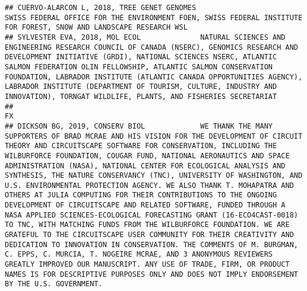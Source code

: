 \documentclass[]{article}
\begin{document}
\begin{verbatim}
## CUERVO-ALARCON L, 2018, TREE GENET GENOMES                                                                                                                                                                                                                                                                                                                   SWISS FEDERAL OFFICE FOR THE ENVIRONMENT FOEN, SWISS FEDERAL INSTITUTE FOR FOREST, SNOW AND LANDSCAPE RESEARCH WSL
## SYLVESTER EVA, 2018, MOL ECOL              NATURAL SCIENCES AND ENGINEERING RESEARCH COUNCIL OF CANADA (NSERC), GENOMICS RESEARCH AND DEVELOPMENT INITIATIVE (GRDI), NATIONAL SCIENCES NSERC, ATLANTIC SALMON FEDERATION OLIN FELLOWSHIP, ATLANTIC SALMON CONSERVATION FOUNDATION, LABRADOR INSTITUTE (ATLANTIC CANADA OPPORTUNITIES AGENCY), LABRADOR INSTITUTE (DEPARTMENT OF TOURISM, CULTURE, INDUSTRY AND INNOVATION), TORNGAT WILDLIFE, PLANTS, AND FISHERIES SECRETARIAT
##                                                                                                                                                                                                                                                                                                                                                                                                                                                                                                                                                                                                                                                                                                                                                                                                                                                                                                                                                                                                                                                                                                                                                 FX
## DICKSON BG, 2019, CONSERV BIOL             WE THANK THE MANY SUPPORTERS OF BRAD MCRAE AND HIS VISION FOR THE DEVELOPMENT OF CIRCUIT THEORY AND CIRCUITSCAPE SOFTWARE FOR CONSERVATION, INCLUDING THE WILBURFORCE FOUNDATION, COUGAR FUND, NATIONAL AERONAUTICS AND SPACE ADMINISTRATION (NASA), NATIONAL CENTER FOR ECOLOGICAL ANALYSIS AND SYNTHESIS, THE NATURE CONSERVANCY (TNC), UNIVERSITY OF WASHINGTON, AND U.S. ENVIRONMENTAL PROTECTION AGENCY. WE ALSO THANK T. MOHAPATRA AND OTHERS AT JULIA COMPUTING FOR THEIR CONTRIBUTIONS TO THE ONGOING DEVELOPMENT OF CIRCUITSCAPE AND RELATED SOFTWARE, FUNDED THROUGH A NASA APPLIED SCIENCES-ECOLOGICAL FORECASTING GRANT (16-ECO4CAST-0018) TO TNC, WITH MATCHING FUNDS FROM THE WILBURFORCE FOUNDATION. WE ARE GRATEFUL TO THE CIRCUITSCAPE USER COMMUNITY FOR THEIR CREATIVITY AND DEDICATION TO INNOVATION IN CONSERVATION. THE COMMENTS OF M. BURGMAN, C. EPPS, C. MURCIA, T. NOGEIRE MCRAE, AND 3 ANONYMOUS REVIEWERS GREATLY IMPROVED OUR MANUSCRIPT. ANY USE OF TRADE, FIRM, OR PRODUCT NAMES IS FOR DESCRIPTIVE PURPOSES ONLY AND DOES NOT IMPLY ENDORSEMENT BY THE U.S. GOVERNMENT.

\end{verbatim}
\end{document}
